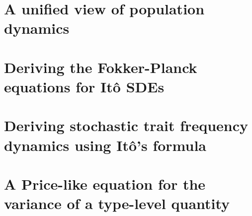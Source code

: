 \documentclass[twoside, 12pt]{iiser-thesis}
\begin{document}
\chapter{A unified view of population dynamics}\label{chap_unification}

%
% 
% 

\cleardoublepage
{}
\appendix
{}

\renewcommand{\chaptername}{Appendix} 
\chapter{Deriving the Fokker-Planck equations for It\^{o} SDEs}\label{App_SDE_FPE}

\chapter{Deriving stochastic trait frequency dynamics using It\^{o}'s formula}\label{App_density_to_freq}

\chapter{A Price-like equation for the variance of a type-level quantity}\label{App_stoch_var_eqns}


\printbibliography[title=References]
\end{document}

